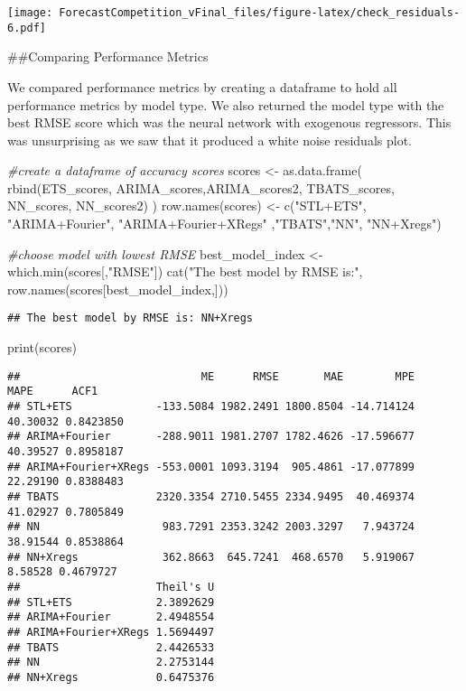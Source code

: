 \documentclass[
]{article}
\newenvironment{Shaded}{\begin{snugshade}}{\end{snugshade}}
\newcommand{\CommentTok}[1]{\textcolor[rgb]{0.56,0.35,0.01}{\textit{#1}}}
\newcommand{\FunctionTok}[1]{\textcolor[rgb]{0.00,0.00,0.00}{#1}}
\newcommand{\NormalTok}[1]{#1}
\newcommand{\OtherTok}[1]{\textcolor[rgb]{0.56,0.35,0.01}{#1}}
\newcommand{\StringTok}[1]{\textcolor[rgb]{0.31,0.60,0.02}{#1}}
\begin{document}
\texttt{[image: ForecastCompetition\_vFinal\_files/figure-latex/check\_residuals-6.pdf]}

\#\#Comparing Performance Metrics

We compared performance metrics by creating a dataframe to hold all
performance metrics by model type. We also returned the model type with
the best RMSE score which was the neural network with exogenous
regressors. This was unsurprising as we saw that it produced a white
noise residuals plot.

\begin{Shaded}
\begin{Highlighting}[]
\CommentTok{\#create a dataframe of accuracy scores}
\NormalTok{scores }\OtherTok{\textless{}{-}} \FunctionTok{as.data.frame}\NormalTok{(}
  \FunctionTok{rbind}\NormalTok{(ETS\_scores, ARIMA\_scores,ARIMA\_scores2, TBATS\_scores, NN\_scores, NN\_scores2)}
\NormalTok{  )}
\FunctionTok{row.names}\NormalTok{(scores) }\OtherTok{\textless{}{-}} \FunctionTok{c}\NormalTok{(}\StringTok{"STL+ETS"}\NormalTok{, }\StringTok{"ARIMA+Fourier"}\NormalTok{, }\StringTok{"ARIMA+Fourier+XRegs"}\NormalTok{ ,}\StringTok{"TBATS"}\NormalTok{,}\StringTok{"NN"}\NormalTok{, }\StringTok{"NN+Xregs"}\NormalTok{)}

\CommentTok{\#choose model with lowest RMSE}
\NormalTok{best\_model\_index }\OtherTok{\textless{}{-}} \FunctionTok{which.min}\NormalTok{(scores[,}\StringTok{"RMSE"}\NormalTok{])}
\FunctionTok{cat}\NormalTok{(}\StringTok{"The best model by RMSE is:"}\NormalTok{, }\FunctionTok{row.names}\NormalTok{(scores[best\_model\_index,])) }
\end{Highlighting}
\end{Shaded}

\begin{verbatim}
## The best model by RMSE is: NN+Xregs
\end{verbatim}

\begin{Shaded}
\begin{Highlighting}[]
\FunctionTok{print}\NormalTok{(scores)}
\end{Highlighting}
\end{Shaded}

\begin{verbatim}
##                            ME      RMSE       MAE        MPE     MAPE      ACF1
## STL+ETS             -133.5084 1982.2491 1800.8504 -14.714124 40.30032 0.8423850
## ARIMA+Fourier       -288.9011 1981.2707 1782.4626 -17.596677 40.39527 0.8958187
## ARIMA+Fourier+XRegs -553.0001 1093.3194  905.4861 -17.077899 22.29190 0.8388483
## TBATS               2320.3354 2710.5455 2334.9495  40.469374 41.02927 0.7805849
## NN                   983.7291 2353.3242 2003.3297   7.943724 38.91544 0.8538864
## NN+Xregs             362.8663  645.7241  468.6570   5.919067  8.58528 0.4679727
##                     Theil's U
## STL+ETS             2.3892629
## ARIMA+Fourier       2.4948554
## ARIMA+Fourier+XRegs 1.5694497
## TBATS               2.4426533
## NN                  2.2753144
## NN+Xregs            0.6475376
\end{verbatim}
\end{document}
